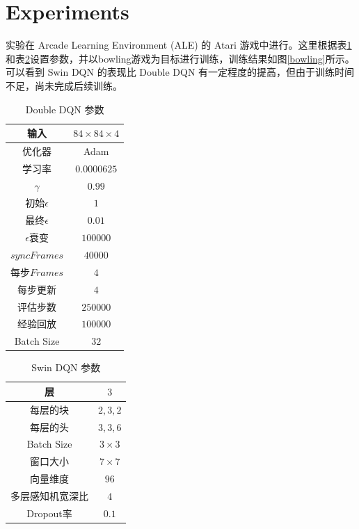\documentclass[final,1p,12pt,UTF8,review]{elsarticle}
\begin{document}
\section{Experiments}
实验在 Arcade Learning Environment (ALE) 的 Atari 游戏中进行。这里根据表\ref{DDQN}和表\ref{SDQN}设置参数，并以bowling游戏为目标进行训练，训练结果如图\ref{bowling}所示。可以看到 Swin DQN 的表现比 Double DQN 有一定程度的提高，但由于训练时间不足，尚未完成后续训练。
\begin{table}[http]
    \centering
    \caption{Double DQN 参数}
    \label{DDQN}
    \begin{tabular}{c||c}
      \hline\hline
      输入 & $84\times 84\times 4$ \\
      \hline
      优化器 & Adam \\
      \hline
      学习率 & $0.0000625$ \\
      \hline
      $\gamma$ & $0.99$ \\
      \hline
      初始$\epsilon$ & $1$ \\
      \hline
      最终$\epsilon$ & $0.01$ \\
      \hline
      $\epsilon$衰变 & $100000$ \\
      \hline
      $syncFrames$ & $40000$ \\
      \hline
      每步$Frames$ & $4$ \\
      \hline
      每步更新 & $4$ \\
      \hline
      评估步数 & $250000$ \\
      \hline
      经验回放 & $100000$ \\
      \hline
      Batch Size & $32$ \\
      \hline\hline
    \end{tabular}
\end{table}
\begin{table}[http]
    \centering
    \caption{Swin DQN 参数}
    \label{SDQN}
    \begin{tabular}{c||c}
      \hline\hline
      层 & $3$ \\
      \hline
      每层的块 & $2,3,2$ \\
      \hline
      每层的头 & $3,3,6$ \\
      \hline
      Batch Size & $3 \times 3$ \\
      \hline
      窗口大小 & $7 \times 7$ \\
      \hline
      向量维度 & $96$ \\
      \hline
      多层感知机宽深比 & $4$ \\
      \hline
      Dropout率 & $0.1$ \\
      \hline\hline
    \end{tabular}
\end{table}
\end{document}
